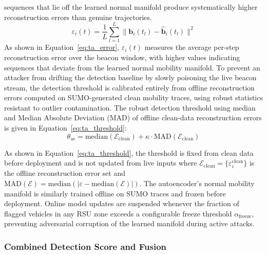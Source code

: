 \documentclass[12pt, a4paper]{report}
\begin{document}
sequences that lie off the learned normal manifold produce
systematically higher reconstruction errors than genuine trajectories.
\begin{equation}
  \varepsilon_i(t) = \frac{1}{L}\sum_{l=1}^{L}
    \bigl\|\mathbf{b}_i(t_l) -
    \hat{\mathbf{b}}_i(t_l)\bigr\|^2
  \label{eq:ta_error}
\end{equation}
As shown in Equation~\ref{eq:ta_error}, $\varepsilon_i(t)$ measures
the average per-step reconstruction error over the beacon window,
with higher values indicating sequences that deviate from the learned
normal mobility manifold.
\newline
\newline
To prevent an attacker from drifting the detection baseline by
slowly poisoning the live beacon stream, the detection threshold
is calibrated entirely from offline reconstruction errors computed
on SUMO-generated clean mobility traces, using robust statistics
resistant to outlier contamination. The robust detection threshold
using median and Median Absolute Deviation (MAD) of offline
clean-data reconstruction errors is given in
Equation~\ref{eq:ta_threshold}:
\begin{equation}
  \theta_{\mathrm{ae}} =
    \mathrm{median}(\mathcal{E}_{\mathrm{clean}})
    + \kappa \cdot
    \mathrm{MAD}(\mathcal{E}_{\mathrm{clean}})
  \label{eq:ta_threshold}
\end{equation}

As shown in Equation~\ref{eq:ta_threshold}, the threshold is fixed
from clean data before deployment and is not updated from live
inputs where $\mathcal{E}_{\mathrm{clean}} =
\{\varepsilon_i^{\mathrm{clean}}\}$ is the offline reconstruction
error set and $\mathrm{MAD}(\mathcal{E}) =
\mathrm{median}(|\varepsilon -
\mathrm{median}(\mathcal{E})|)$. The autoencoder's normal mobility manifold is similarly
trained offline on SUMO traces and frozen before deployment.
Online model updates are suspended whenever the fraction of flagged
vehicles in any RSU zone exceeds a configurable freeze threshold
$\alpha_{\mathrm{freeze}}$, preventing adversarial corruption of
the learned manifold during active attacks.

\subsubsection{Combined Detection Score and Fusion}
\end{document}

